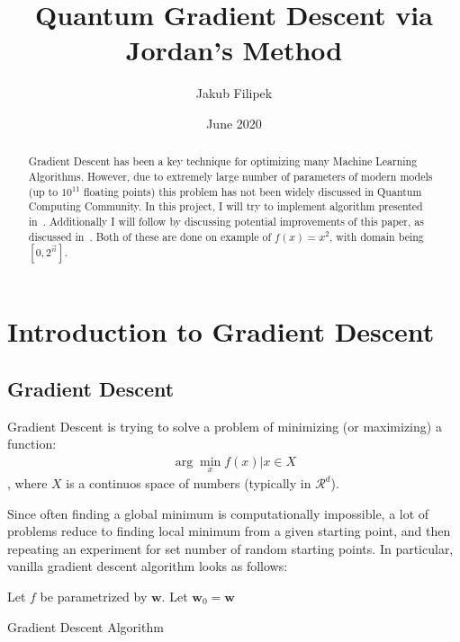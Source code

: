 \documentclass{article}
\title{Quantum Gradient Descent via Jordan's Method}
\author{Jakub Filipek}
\date{June 2020}
\begin{document}
\maketitle

\begin{abstract}
    \noindent Gradient Descent has been a key technique for optimizing many Machine Learning Algorithms.
    However, due to extremely large number of parameters of modern models (up to $10^{11}$ floating points)
    this problem has not been widely discussed in Quantum Computing Community.
    In this project, I will try to implement algorithm presented in~\cite{Jordan_2005}.
    Additionally I will follow by discussing potential improvements of this paper, as discussed in~\cite{Gily_n_2019}.
    Both of these are done on example of $f(x) = x^2$, with domain being $[0, 2^{\vec{n}}]$.
\end{abstract}


\section{Introduction to Gradient Descent}
\label{sec:intro-grad-desc}

\subsection{Gradient Descent}
\label{subsec:grad-desc}
Gradient Descent is trying to solve a problem of minimizing (or maximizing) a function:
\begin{align}
    \arg \min \limits_x f(x) | x \in X
\end{align}, where $X$ is a continuos space of numbers (typically in $\mathcal{R}^d$).

Since often finding a global minimum is computationally impossible, a lot of problems reduce to finding local minimum from a given starting point,
and then repeating an experiment for set number of random starting points. In particular, vanilla gradient descent algorithm looks as follows:
\begin{algorithm}[h]
    \SetAlgoLined
    Let $f$ be parametrized by $\pmb{w}$. \;
    Let $\pmb{w}_0 = \pmb{w}$ \;
    \caption{Gradient Descent Algorithm}
    \label{alg:vanilla-grad-desc}
\end{algorithm}
\end{document}
